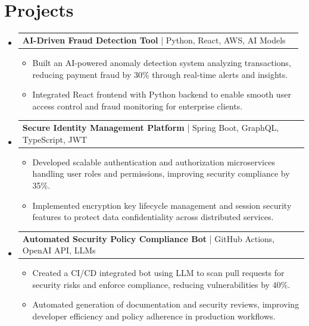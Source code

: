 \documentclass[letterpaper,11pt]{article}
\makeatletter
\newcommand{\resumeItem}[1]{
  \item\footnotesize{
    {#1 \vspace{-2pt}}
  }
}
\newcommand{\resumeProjectHeading}[2]{
    \item
    \begin{tabular*}{1.001\textwidth}{l@{\extracolsep{\fill}}r}
      \small#1 & \textbf{\small #2}\\
    \end{tabular*}\vspace{-7pt}
}
\newcommand{\resumeSubHeadingListStart}{\begin{itemize}[leftmargin=0pt, label={}]}
\newcommand{\resumeSubHeadingListEnd}{\end{itemize}}
\newcommand{\resumeItemListStart}{\begin{itemize}[leftmargin=*]}
\newcommand{\resumeItemListEnd}{\end{itemize}\vspace{-5pt}}
\makeatother
\begin{document}
\section{Projects}
    \vspace{-5pt}
    \resumeSubHeadingListStart
      \resumeProjectHeading
          {\textbf{AI-Driven Fraud Detection Tool} | Python, React, AWS, AI Models}{}
          \resumeItemListStart
              \resumeItem{Built an AI-powered anomaly detection system analyzing transactions, reducing payment fraud by 30\% through real-time alerts and insights.}
              \resumeItem{Integrated React frontend with Python backend to enable smooth user access control and fraud monitoring for enterprise clients.}
          \resumeItemListEnd
          \vspace{-12pt}
      \resumeProjectHeading
          {\textbf{Secure Identity Management Platform} | Spring Boot, GraphQL, TypeScript, JWT}{}
          \resumeItemListStart
              \resumeItem{Developed scalable authentication and authorization microservices handling user roles and permissions, improving security compliance by 35\%.}
              \resumeItem{Implemented encryption key lifecycle management and session security features to protect data confidentiality across distributed services.}
          \resumeItemListEnd
          \vspace{-12pt}
      \resumeProjectHeading
          {\textbf{Automated Security Policy Compliance Bot} | GitHub Actions, OpenAI API, LLMs}{}
          \resumeItemListStart
              \resumeItem{Created a CI/CD integrated bot using LLM to scan pull requests for security risks and enforce compliance, reducing vulnerabilities by 40\%.}
              \resumeItem{Automated generation of documentation and security reviews, improving developer efficiency and policy adherence in production workflows.}
          \resumeItemListEnd 
    \resumeSubHeadingListEnd
\end{document}
